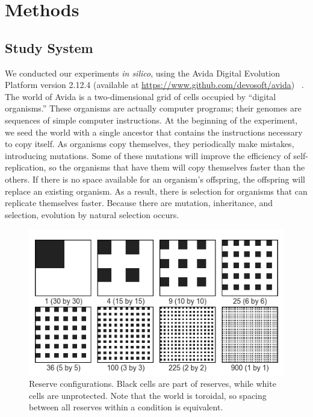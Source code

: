 \documentclass[letterpaper]{article}
\begin{document}
\section{Methods}
\subsection{Study System}
We conducted our experiments \textit{in silico}, using the Avida Digital Evolution Platform version 2.12.4 (available at \href{url}{https://www.github.com/devosoft/avida}) ~\citep{ofria_avida:_2004}. The world of Avida is a two-dimensional grid of cells occupied by “digital organisms.” These organisms are actually computer programs; their genomes are sequences of simple computer instructions. At the beginning of the experiment, we seed the world with a single ancestor that contains the instructions necessary to copy itself. As organisms copy themselves, they periodically make mistakes, introducing mutations. Some of these mutations will improve the efficiency of self-replication, so the organisms that have them will copy themselves faster than the others. If there is no space available for an organism’s offspring, the offspring will replace an existing organism. As a result, there is selection for organisms that can replicate themselves faster. Because there are mutation, inheritance, and selection, evolution by natural selection occurs. 

\begin{figure}[h]
	\centering
	\includegraphics[]{reserves.png}
    \caption{Reserve configurations. Black cells are part of reserves, while white cells are unprotected. Note that the world is toroidal, so spacing between all reserves within a condition is equivalent.}
    \label{fig:reserveconfigs}
\end{figure}
\end{document}
